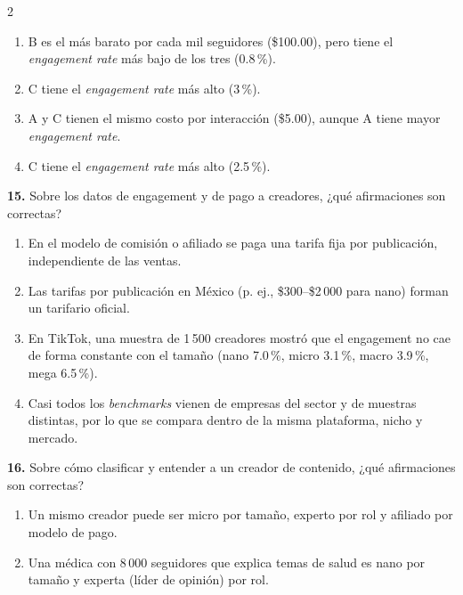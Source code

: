 \documentclass[10pt,letterpaper]{article}
\newcommand{\cas}{\framebox[1.0em]{\rule{0pt}{1.05ex}}}
\begin{document}
\begin{multicols}{2}
\begin{minipage}[t]{\columnwidth}
\begin{enumerate}[label=\cas\ \alph*),leftmargin=2.3em,itemsep=1.2pt,topsep=1pt,parsep=0pt,partopsep=0pt]
\item B es el más barato por cada mil seguidores (\$100.00), pero tiene el \textit{engagement rate} más bajo de los tres (0.8\,\%).
\item C tiene el \textit{engagement rate} más alto (3\,\%).
\item A y C tienen el mismo costo por interacción (\$5.00), aunque A tiene mayor \textit{engagement rate}.
\item C tiene el \textit{engagement rate} más alto (2.5\,\%).
\end{enumerate}\end{minipage}\par\vspace{3pt}
\begin{minipage}[t]{\columnwidth}\noindent\textbf{15.} Sobre los datos de engagement y de pago a creadores, ¿qué afirmaciones son correctas?
\vspace{1pt}\begin{enumerate}[label=\cas\ \alph*),leftmargin=2.3em,itemsep=1.2pt,topsep=1pt,parsep=0pt,partopsep=0pt]
\item En el modelo de comisión o afiliado se paga una tarifa fija por publicación, independiente de las ventas.
\item Las tarifas por publicación en México (p. ej., \$300--\$2\,000 para nano) forman un tarifario oficial.
\item En TikTok, una muestra de 1\,500 creadores mostró que el engagement no cae de forma constante con el tamaño (nano 7.0\,\%, micro 3.1\,\%, macro 3.9\,\%, mega 6.5\,\%).
\item Casi todos los \textit{benchmarks} vienen de empresas del sector y de muestras distintas, por lo que se compara dentro de la misma plataforma, nicho y mercado.
\end{enumerate}\end{minipage}\par\vspace{3pt}
\begin{minipage}[t]{\columnwidth}\noindent\textbf{16.} Sobre cómo clasificar y entender a un creador de contenido, ¿qué afirmaciones son correctas?
\vspace{1pt}\begin{enumerate}[label=\cas\ \alph*),leftmargin=2.3em,itemsep=1.2pt,topsep=1pt,parsep=0pt,partopsep=0pt]
\item Un mismo creador puede ser micro por tamaño, experto por rol y afiliado por modelo de pago.
\item Una médica con 8\,000 seguidores que explica temas de salud es nano por tamaño y experta (líder de opinión) por rol.

\end{enumerate}
\end{minipage}
\end{multicols}
\end{document}
